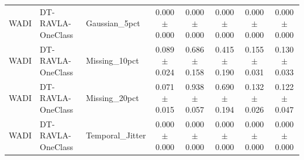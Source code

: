 \begin{table}[t]
\begin{tabular}{lllccccc}
WADI & DT-RAVLA-OneClass & Gaussian_5pct & 0.000 $\pm$ 0.000 & 0.000 $\pm$ 0.000 & 0.000 $\pm$ 0.000 & 0.000 $\pm$ 0.000 & 0.000 $\pm$ 0.000 \\
WADI & DT-RAVLA-OneClass & Missing_10pct & 0.089 $\pm$ 0.024 & 0.686 $\pm$ 0.158 & 0.415 $\pm$ 0.190 & 0.155 $\pm$ 0.031 & 0.130 $\pm$ 0.033 \\
WADI & DT-RAVLA-OneClass & Missing_20pct & 0.071 $\pm$ 0.015 & 0.938 $\pm$ 0.057 & 0.690 $\pm$ 0.194 & 0.132 $\pm$ 0.026 & 0.122 $\pm$ 0.047 \\
WADI & DT-RAVLA-OneClass & Temporal_Jitter & 0.000 $\pm$ 0.000 & 0.000 $\pm$ 0.000 & 0.000 $\pm$ 0.000 & 0.000 $\pm$ 0.000 & 0.000 $\pm$ 0.000 \\
\hline
\end{tabular}
\end{table}